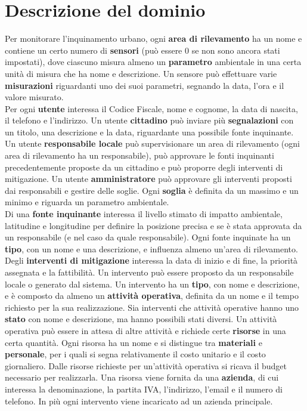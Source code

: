 \newpage
\section{Descrizione del dominio}
Per monitorare l'inquinamento urbano, ogni \textbf{area di rilevamento} ha un nome e contiene un certo numero di \textbf{sensori} (può essere 0 se non sono ancora stati impostati), dove ciascuno misura almeno un \textbf{parametro} ambientale in una certa unità di misura che ha nome e descrizione. Un sensore può effettuare varie \textbf{misurazioni} riguardanti uno dei suoi parametri, segnando la data, l'ora e il valore misurato.\\

Per ogni \textbf{utente} interessa il Codice Fiscale, nome e cognome, la data di nascita, il telefono e l'indirizzo. Un utente \textbf{cittadino} può inviare più \textbf{segnalazioni} con un titolo, una descrizione e la data, riguardante una possibile fonte inquinante. Un utente \textbf{responsabile locale} può supervisionare un area di rilevamento (ogni area di rilevamento ha un responsabile), può approvare le fonti inquinanti precedentemente proposte da un cittadino e può proporre degli interventi di mitigazione. Un utente \textbf{amministratore} può approvare gli interventi proposti dai responsabili e gestire delle soglie. Ogni \textbf{soglia} è definita da un massimo e un minimo e riguarda un parametro ambientale.\\

Di una \textbf{fonte inquinante} interessa il livello stimato di impatto ambientale, latitudine e longitudine per definire la posizione precisa e se è stata approvata da un responsabile (e nel caso da quale responsabile). Ogni fonte inquinate ha un \textbf{tipo}, con un nome e una descrizione, e influenza almeno un'area di rilevamento.\\	

Degli \textbf{interventi di mitigazione} interessa la data di inizio e di fine, la priorità assegnata e la fattibilità. Un intervento può essere proposto da un responsabile locale o generato dal sistema. Un intervento  ha un \textbf{tipo}, con nome e descrizione, e è composto da almeno un \textbf{attività operativa}, definita da un nome e il tempo richiesto per la sua realizzazione. Sia interventi che attività operative hanno uno \textbf{stato} con nome e descrizione, ma hanno possibili stati diversi. Un attività operativa può essere in attesa di altre attività e richiede certe \textbf{risorse} in una certa quantità. Ogni risorsa ha un nome e si distingue tra \textbf{materiali} e \textbf{personale}, per i quali si segna relativamente il costo unitario e il costo giornaliero. Dalle risorse richieste per un'attività operativa si ricava il budget necessario per realizzarla.
Una risorsa viene fornita da una \textbf{azienda}, di cui interessa la denominazione, la partita IVA, l'indirizzo, l'email e il numero di telefono. In più ogni intervento viene incaricato ad un azienda principale.


